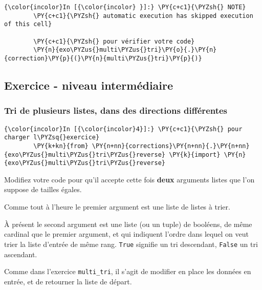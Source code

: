     \begin{Verbatim}[commandchars=\\\{\}]
{\color{incolor}In [{\color{incolor} }]:} \PY{c+c1}{\PYZsh{} NOTE}
        \PY{c+c1}{\PYZsh{} automatic execution has skipped execution of this cell}
        
        \PY{c+c1}{\PYZsh{} pour vérifier votre code}
        \PY{n}{exo\PYZus{}multi\PYZus{}tri}\PY{o}{.}\PY{n}{correction}\PY{p}{(}\PY{n}{multi\PYZus{}tri}\PY{p}{)}
\end{Verbatim}


    \hypertarget{exercice---niveau-intermuxe9diaire}{%
\subsection{Exercice - niveau
intermédiaire}\label{exercice---niveau-intermuxe9diaire}}

    \hypertarget{tri-de-plusieurs-listes-dans-des-directions-diffuxe9rentes}{%
\subsubsection{Tri de plusieurs listes, dans des directions
différentes}\label{tri-de-plusieurs-listes-dans-des-directions-diffuxe9rentes}}

    \begin{Verbatim}[commandchars=\\\{\}]
{\color{incolor}In [{\color{incolor}4}]:} \PY{c+c1}{\PYZsh{} pour charger l\PYZsq{}exercice}
        \PY{k+kn}{from} \PY{n+nn}{corrections}\PY{n+nn}{.}\PY{n+nn}{exo\PYZus{}multi\PYZus{}tri\PYZus{}reverse} \PY{k}{import} \PY{n}{exo\PYZus{}multi\PYZus{}tri\PYZus{}reverse}
\end{Verbatim}


    Modifiez votre code pour qu'il accepte cette fois \textbf{deux}
arguments listes que l'on suppose de tailles égales.

Comme tout à l'heure le premier argument est une liste de listes à
trier.

À présent le second argument est une liste (ou un tuple) de booléens, de
même cardinal que le premier argument, et qui indiquent l'ordre dans
lequel on veut trier la liste d'entrée de même rang. \texttt{True}
signifie un tri descendant, \texttt{False} un tri ascendant.

Comme dans l'exercice \texttt{multi\_tri}, il s'agit de modifier en
place les données en entrée, et de retourner la liste de départ.

